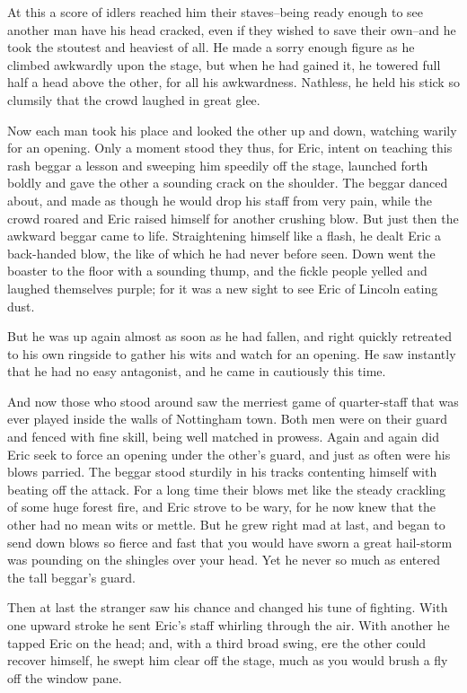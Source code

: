 At this a score of idlers reached him their staves--being ready enough
to see another man have his head cracked, even if they wished to save
their own--and he took the stoutest and heaviest of all. He made a sorry
enough figure as he climbed awkwardly upon the stage, but when he had
gained it, he towered full half a head above the other, for all his
awkwardness. Nathless, he held his stick so clumsily that the crowd
laughed in great glee.

Now each man took his place and looked the other up and down, watching
warily for an opening. Only a moment stood they thus, for Eric, intent
on teaching this rash beggar a lesson and sweeping him speedily off the
stage, launched forth boldly and gave the other a sounding crack on the
shoulder. The beggar danced about, and made as though he would drop his
staff from very pain, while the crowd roared and Eric raised himself for
another crushing blow. But just then the awkward beggar came to life.
Straightening himself like a flash, he dealt Eric a back-handed blow,
the like of which he had never before seen. Down went the boaster to the
floor with a sounding thump, and the fickle people yelled and laughed
themselves purple; for it was a new sight to see Eric of Lincoln eating
dust.

But he was up again almost as soon as he had fallen, and right quickly
retreated to his own ringside to gather his wits and watch for an
opening. He saw instantly that he had no easy antagonist, and he came in
cautiously this time.

And now those who stood around saw the merriest game of quarter-staff
that was ever played inside the walls of Nottingham town. Both men were
on their guard and fenced with fine skill, being well matched in
prowess. Again and again did Eric seek to force an opening under the
other's guard, and just as often were his blows parried. The beggar
stood sturdily in his tracks contenting himself with beating off the
attack. For a long time their blows met like the steady crackling of
some huge forest fire, and Eric strove to be wary, for he now knew that
the other had no mean wits or mettle. But he grew right mad at last, and
began to send down blows so fierce and fast that you would have sworn a
great hail-storm was pounding on the shingles over your head. Yet he
never so much as entered the tall beggar's guard.

Then at last the stranger saw his chance and changed his tune of
fighting. With one upward stroke he sent Eric's staff whirling through
the air. With another he tapped Eric on the head; and, with a third
broad swing, ere the other could recover himself, he swept him clear off
the stage, much as you would brush a fly off the window pane.

